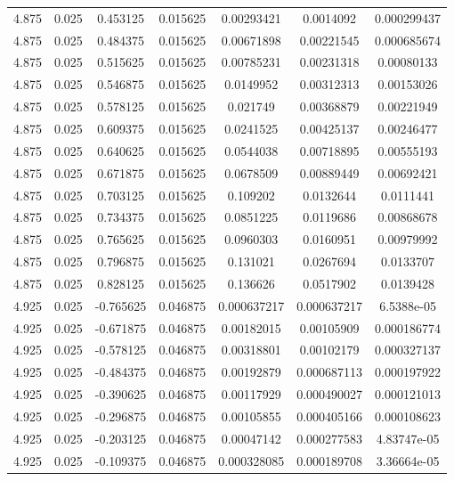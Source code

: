 \begin{table}[bh]
\begin{center}
{\begin{tabular}{ccccccc}
4.875	 & 0.025 & 	0.453125	 & 0.015625	 & 0.00293421	 & 0.0014092	 & 0.000299437 \\ 
4.875	 & 0.025 & 	0.484375	 & 0.015625	 & 0.00671898	 & 0.00221545	 & 0.000685674 \\ 
4.875	 & 0.025 & 	0.515625	 & 0.015625	 & 0.00785231	 & 0.00231318	 & 0.00080133 \\ 
4.875	 & 0.025 & 	0.546875	 & 0.015625	 & 0.0149952	 & 0.00312313	 & 0.00153026 \\ 
4.875	 & 0.025 & 	0.578125	 & 0.015625	 & 0.021749	 & 0.00368879	 & 0.00221949 \\ 
4.875	 & 0.025 & 	0.609375	 & 0.015625	 & 0.0241525	 & 0.00425137	 & 0.00246477 \\ 
4.875	 & 0.025 & 	0.640625	 & 0.015625	 & 0.0544038	 & 0.00718895	 & 0.00555193 \\ 
4.875	 & 0.025 & 	0.671875	 & 0.015625	 & 0.0678509	 & 0.00889449	 & 0.00692421 \\ 
4.875	 & 0.025 & 	0.703125	 & 0.015625	 & 0.109202	 & 0.0132644	 & 0.0111441 \\ 
4.875	 & 0.025 & 	0.734375	 & 0.015625	 & 0.0851225	 & 0.0119686	 & 0.00868678 \\ 
4.875	 & 0.025 & 	0.765625	 & 0.015625	 & 0.0960303	 & 0.0160951	 & 0.00979992 \\ 
4.875	 & 0.025 & 	0.796875	 & 0.015625	 & 0.131021	 & 0.0267694	 & 0.0133707 \\ 
4.875	 & 0.025 & 	0.828125	 & 0.015625	 & 0.136626	 & 0.0517902	 & 0.0139428 \\ 
4.925	 & 0.025 & 	-0.765625	 & 0.046875	 & 0.000637217	 & 0.000637217	 & 6.5388e-05 \\ 
4.925	 & 0.025 & 	-0.671875	 & 0.046875	 & 0.00182015	 & 0.00105909	 & 0.000186774 \\ 
4.925	 & 0.025 & 	-0.578125	 & 0.046875	 & 0.00318801	 & 0.00102179	 & 0.000327137 \\ 
4.925	 & 0.025 & 	-0.484375	 & 0.046875	 & 0.00192879	 & 0.000687113	 & 0.000197922 \\ 
4.925	 & 0.025 & 	-0.390625	 & 0.046875	 & 0.00117929	 & 0.000490027	 & 0.000121013 \\ 
4.925	 & 0.025 & 	-0.296875	 & 0.046875	 & 0.00105855	 & 0.000405166	 & 0.000108623 \\ 
4.925	 & 0.025 & 	-0.203125	 & 0.046875	 & 0.00047142	 & 0.000277583	 & 4.83747e-05 \\ 
4.925	 & 0.025 & 	-0.109375	 & 0.046875	 & 0.000328085	 & 0.000189708	 & 3.36664e-05 \\ 

\end{tabular}}
\end{center}
\end{table}
